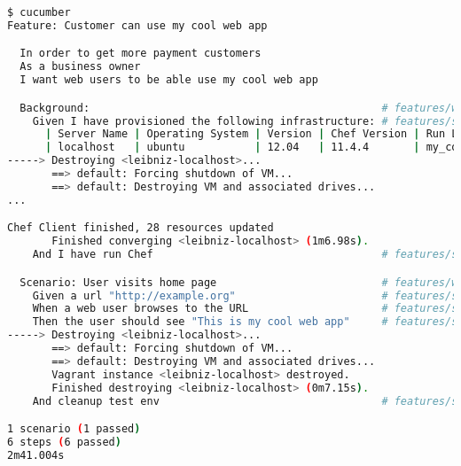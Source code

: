 \begin{lstlisting}[language=Bash,label=lst:testing-cucumber-spec3]
$ cucumber
Feature: Customer can use my cool web app

  In order to get more payment customers
  As a business owner
  I want web users to be able use my cool web app

  Background:                                              # features/working_web_page.feature:7
    Given I have provisioned the following infrastructure: # features/step_definitions/working_web_page.rb:1
      | Server Name | Operating System | Version | Chef Version | Run List             |
      | localhost   | ubuntu           | 12.04   | 11.4.4       | my_cool_app::default |
-----> Destroying <leibniz-localhost>...
       ==> default: Forcing shutdown of VM...
       ==> default: Destroying VM and associated drives...
...

Chef Client finished, 28 resources updated
       Finished converging <leibniz-localhost> (1m6.98s).
    And I have run Chef                                    # features/step_definitions/working_web_page.rb:5

  Scenario: User visits home page                          # features/working_web_page.feature:14
    Given a url "http://example.org"                       # features/step_definitions/working_web_page.rb:10
    When a web user browses to the URL                     # features/step_definitions/working_web_page.rb:14
    Then the user should see "This is my cool web app"     # features/step_definitions/working_web_page.rb:21
-----> Destroying <leibniz-localhost>...
       ==> default: Forcing shutdown of VM...
       ==> default: Destroying VM and associated drives...
       Vagrant instance <leibniz-localhost> destroyed.
       Finished destroying <leibniz-localhost> (0m7.15s).
    And cleanup test env                                   # features/step_definitions/working_web_page.rb:25

1 scenario (1 passed)
6 steps (6 passed)
2m41.004s
\end{lstlisting}